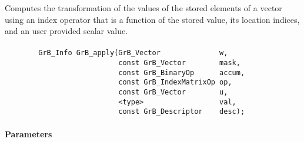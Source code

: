 Computes the transformation of the values of the stored elements of a vector
using an index operator that is a function of the stored value, its location 
indices, and an user provided scalar value.

\paragraph{\syntax}

\begin{verbatim}
        GrB_Info GrB_apply(GrB_Vector              w,
                           const GrB_Vector        mask,
                           const GrB_BinaryOp      accum,
                           const GrB_IndexMatrixOp op,
                           const GrB_Vector        u,
                           <type>                  val,
                           const GrB_Descriptor    desc);
\end{verbatim}

\paragraph{Parameters}

